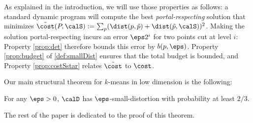 As explained in the introduction, we will use those properties as follows: a standard dynamic program will compute the best \emph{portal-respecting} solution that minimizes $\tilde{\cost}(P, \calS) := \sum_p (\dist(p, \tilde p) + \dist(\tilde p, \calS))^2$. Making the solution portal-respecting incurs an error $\eps 2^i$ for two points cut at level $i$: Property \ref{prop:det} therefore bounds this error by $b(p, \eps)$. Property \ref{prop:budget} of \cref{def:smallDist} ensures that the total budget is bounded, and Property \ref{prop:costSstar} relates $\tilde{ \cost}$ to $\cost$.

Our main structural theorem for $k$-means in low dimension is the following:

\begin{theorem}\label{thm:smallDist}
    For any $\eps > 0$, $\calD$ has $\eps$-small-distortion with probability at least $2/3$.
\end{theorem}
The rest of the paper is dedicated to the proof of this theorem.


